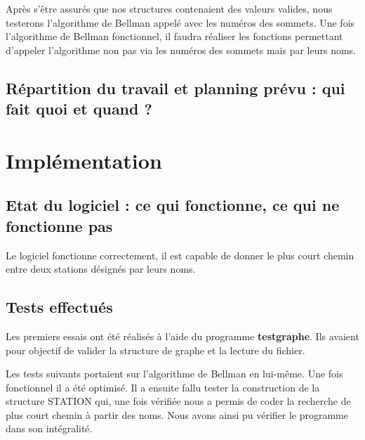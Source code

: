 \documentclass{report}
\begin{document}
Après s’être assurés que nos structures contenaient des valeurs valides, nous testerons l’algorithme de Bellman appelé avec les numéros des sommets.
Une fois l’algorithme de Bellman fonctionnel, il faudra réaliser les fonctions permettant d’appeler l’algorithme non pas via les numéros des sommets mais par leurs noms.

\section{Répartition du travail et planning prévu : qui fait quoi et quand ?}
\chapter{Implémentation}
\section{Etat du logiciel : ce qui fonctionne, ce qui ne fonctionne pas}
Le logiciel fonctionne correctement, il est capable de donner le plus court chemin entre deux stations désignés par leurs noms.
\section{Tests effectués}
Les premiers essais ont été réalisés à l'aide du programme \textbf{testgraphe}. Ils avaient pour objectif de valider la structure de graphe et la lecture du fichier.

Les tests suivants portaient sur l'algorithme de Bellman en lui-même. Une fois fonctionnel il a été optimisé.
Il a ensuite fallu tester la construction de la structure STATION qui, une fois vérifiée nous a permis de coder la recherche de plus court chemin à partir des noms. Nous avons ainsi pu vérifier le programme dans son intégralité.
\end{document}
